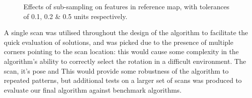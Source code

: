 \documentclass[authoryearcitations]{UoYCSproject}
\begin{document}
\begin{figure}[ht]
\begin{subfigure}[b]{0.30\textwidth}
\end{subfigure}
\begin{subfigure}[b]{0.30\textwidth}
\end{subfigure}
\begin{subfigure}[b]{0.30\textwidth}
\end{subfigure}
\caption{Effects of sub-sampling on features in reference map, with tolerances of 0.1, 0.2 \& 0.5 units respectively.}
\label{fig:map_density}

\end{figure}
A single scan was utilised throughout the design of the algorithm to facilitate the quick evaluation of solutions, and was picked due to the presence of multiple corners pointing to the scan location: this would cause some complexity in the algorithm's ability to correctly select the rotation in a difficult environment. The scan, it's pose and This would provide some robustness of the algorithm to repeated patterns, but additional tests on a larger set of scans was produced to evaluate our final algorithm against benchmark algorithms.
\end{document}

